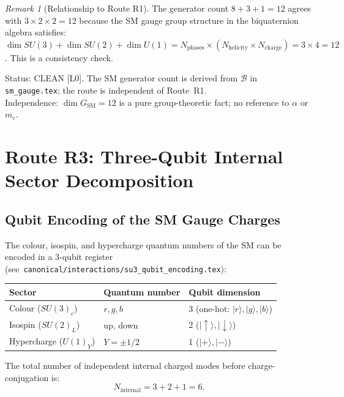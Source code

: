 \documentclass[12pt,a4paper]{article}
\theoremstyle{definition}
\theoremstyle{remark}
\newtheorem{remark}[theorem]{Remark}
\begin{document}
\begin{remark}[Relationship to Route R1]
The generator count $8+3+1=12$ agrees with $3\times2\times2=12$ because the SM
gauge group structure in the biquaternion algebra satisfies:
$\dim SU(3) + \dim SU(2) + \dim U(1) = N_{\mathrm{phases}} \times (N_{\mathrm{helicity}} \times N_{\mathrm{charge}}) = 3 \times 4 = 12$.
This is a consistency check.
\end{remark}

\begin{resultbox}
Status: CLEAN [L0].  The SM generator count is derived from $\mathcal{B}$ in
\texttt{sm\_gauge.tex}; the route is independent of Route~R1.\\
Independence: $\dim G_{\mathrm{SM}} = 12$ is a pure group-theoretic fact;
no reference to $\alpha$ or $m_e$.
\end{resultbox}

\section{Route R3: Three-Qubit Internal Sector Decomposition}
\label{sec:neff12:R3}

\subsection{Qubit Encoding of the SM Gauge Charges}
\label{ssec:neff12:R3:encoding}

The colour, isospin, and hypercharge quantum numbers of the SM can be encoded
in a 3-qubit register (see~\texttt{canonical/interactions/su3\_qubit\_encoding.tex}):

\begin{center}
\begin{tabular}{lll}
\toprule
Sector & Quantum number & Qubit dimension \\
\midrule
Colour ($SU(3)_c$) & $r, g, b$ & 3 (one-hot: $|r\rangle, |g\rangle, |b\rangle$) \\
Isospin ($SU(2)_L$) & up, down & 2 ($|\uparrow\rangle, |\downarrow\rangle$) \\
Hypercharge ($U(1)_Y$) & $Y = \pm 1/2$ & 1 ($|+\rangle, |-\rangle$) \\
\bottomrule
\end{tabular}
\end{center}

The total number of independent internal charged modes before charge-conjugation is:
\begin{equation}
  N_{\mathrm{internal}} = 3 + 2 + 1 = 6.
  \label{eq:neff12:R3:internal}
\end{equation}
\end{document}
